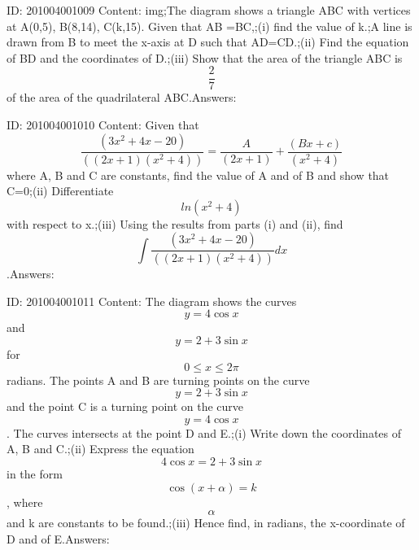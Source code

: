 \documentclass{article}
\begin{document}
ID: 201004001009
Content:
img;The diagram shows a triangle ABC with vertices at A(0,5), B(8,14), C(k,15). Given that AB =BC,;(i) find the value of k.;A line is drawn from B to meet the x-axis at D such that AD=CD.;(ii) Find the equation of BD and the coordinates of D.;(iii) Show that the area of the triangle ABC is $$\frac{2}{7}$$ of the area of the quadrilateral ABC.Answers:

ID: 201004001010
Content:
Given that $$\frac{(3x^2+4x-20)}{((2x+1)(x^2+4))} =\frac{A}{(2x+1)} +\frac{(Bx+c)}{(x^2+4)} $$ where A, B and C are constants, find the value of A and of B and show that C=0;(ii) Differentiate $$ln(x^2+4)$$ with respect to x.;(iii) Using the results from parts (i) and (ii), find $$\int\frac{(3x^2+4x-20)}{((2x+1)(x^2+4))} dx$$.Answers:

ID: 201004001011
Content:
The diagram shows the curves $$y=4\cos x$$ and $$y=2+3\sin x$$ for $$0\leq x\leq2 \pi$$ radians. The points A and B are turning points on the curve $$y=2+3\sin x$$ and the point C is a turning point on the curve $$y=4\cos x$$. The curves intersects at the point D and E.;(i) Write down the coordinates of A, B and C.;(ii) Express the equation $$4\cos x =2+3\sin x$$ in the form $$\cos (x+ \alpha) =k$$, where $$\alpha$$ and k are constants to be found.;(iii) Hence find, in radians, the x-coordinate of D and of E.Answers:
\end{document}
